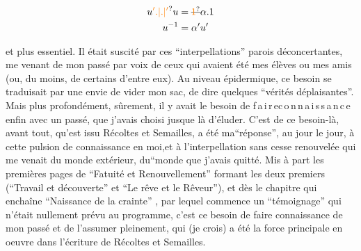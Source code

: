 \[
\begin{aligned}
u\unsure{'.|.|'}u&=\deleted{\unsure{1}}\alpha.1\\
u^{-1}&=\alpha'u'
\end{aligned}
\]


et plus essentiel. Il était suscité par ces ``interpellations'' parois déconcertantes, me venant de mon passé  par  voix  de ceux qui avaient été mes élèves ou mes amis (ou, du moins, de certains d'entre eux). Au niveau épidermique, ce besoin se traduisait par une envie de vider  mon sac, de dire quelques ``vérités déplaisantes''. Mais plus profondément, sûrement, il y avait le besoin de \mbox{f\,a\,i\,r\,e\quad c\,o\,n\,n\,a\,i\,s\,s\,a\,n\,c\,e} enfin avec un passé, que j'avais choisi jusque là d'éluder. C'est de ce besoin-là, avant tout, qu'est issu Récoltes et Semailles,  a été ma``réponse'', au jour le jour, à cette pulsion de connaissance en moi,et à l'interpellation sans cesse renouvelée qui me venait du monde extérieur, du``monde  que j'avais quitté.  Mis à part les  premières  pages de  ``Fatuité et Renouvellement''  formant les deux premiers (``Travail et découverte'' et ``Le rêve et le Rêveur''), et dès le chapitre qui enchaîne ``Naissance de la crainte'' , par lequel commence  un ``témoignage'' qui n'était nullement prévu au programme, c'est ce besoin de faire connaissance de mon passé et de l'assumer pleinement, qui (je crois) a été la force principale en oeuvre dans l'écriture de Récoltes et Semailles.


